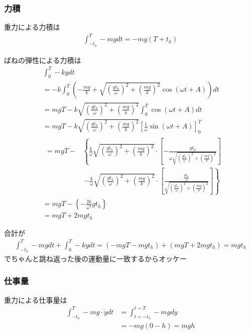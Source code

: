 \documentclass[a4paper,11pt]{jsarticle}
\begin{document}
\subsubsection{力積}
重力による力積は
\begin{align}
  \int_{-t_h}^{T} -mg dt = -mg \left(T + t_h\right)
\end{align}

ばねの弾性による力積は
\begin{align}
   & \int_0^T -ky dt
  \\ & = -k \int_0^T
  \left( -\frac{mg}{k} + \sqrt{\left(\frac{gt_h}{\omega}\right)^2 + \left(\frac{mg}{k}\right)^2} \cos \left( \omega t + A \right) \right) dt
  \\ & = mgT - k \sqrt{\left(\frac{gt_h}{\omega}\right)^2 + \left(\frac{mg}{k}\right)^2} \int_0^T \cos \left( \omega t + A \right) dt
  \\ & = mgT - k \sqrt{\left(\frac{gt_h}{\omega}\right)^2 + \left(\frac{mg}{k}\right)^2} \left[ \frac{1}{\omega} \sin (\omega t + A) \right]_0^T
  \\ & \begin{aligned}
    = mgT -
     & \left\{ \frac{k}{\omega} \sqrt{\left(\frac{gt_h}{\omega}\right)^2 + \left(\frac{mg}{k}\right)^2}
    \cdot \left[- \frac{gt_h}{ \omega \sqrt{\left(\frac{gt_h}{\omega}\right)^2 + \left(\frac{mg}{k}\right)^2} } \right] \right.
    \\
     & \ \left. - \frac{k}{\omega} \sqrt{\left(\frac{gt_h}{\omega}\right)^2 + \left(\frac{mg}{k}\right)^2}
    \cdot \left[ \frac{\frac{gt_h}{\omega}}{\sqrt{\left(\frac{gt_h}{\omega}\right)^2 + \left(\frac{mg}{k}\right)^2}} \right] \right\}
  \end{aligned}
  \\& = mgT - \left\{ - \frac{2k}{\omega^2} gt_h \right\}
  \\& = mgT + 2mgt_h
\end{align}

合計が
\begin{align}
  \int_{-t_h}^{T} -mg dt + \int_0^T -ky dt
  = \left( -mgT - mgt_h \right) + \left( mgT + 2mgt_h \right) = mgt_h
\end{align}
でちゃんと跳ね返った後の運動量に一致するからオッケー

\subsubsection{仕事量}
重力による仕事量は
\begin{align}
  \int_{-t_h}^{T} -mg \cdot \dot{y} dt
   & = \int_{t=-t_h}^{t=T} -mgdy
  \\
   & = -mg(0 - h) = mgh
\end{align}
\end{document}
